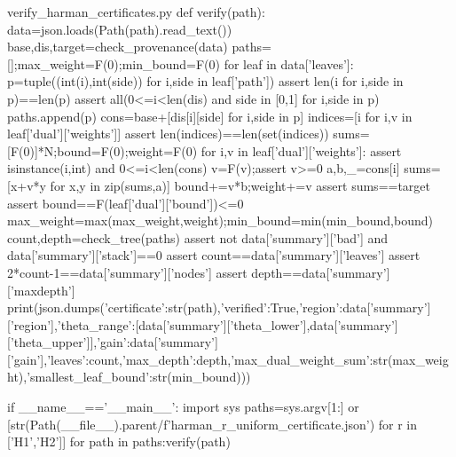 \begin{filecontents*}[overwrite]{verify_harman_certificates.py}
def verify(path):
    data=json.loads(Path(path).read_text())
    base,dis,target=check_provenance(data)
    paths=[];max_weight=F(0);min_bound=F(0)
    for leaf in data['leaves']:
        p=tuple((int(i),int(side)) for i,side in leaf['path'])
        assert len({i for i,side in p})==len(p)
        assert all(0<=i<len(dis) and side in [0,1] for i,side in p)
        paths.append(p)
        cons=base+[dis[i][side] for i,side in p]
        indices=[i for i,v in leaf['dual']['weights']]
        assert len(indices)==len(set(indices))
        sums=[F(0)]*N;bound=F(0);weight=F(0)
        for i,v in leaf['dual']['weights']:
            assert isinstance(i,int) and 0<=i<len(cons)
            v=F(v);assert v>=0
            a,b,_=cons[i]
            sums=[x+v*y for x,y in zip(sums,a)]
            bound+=v*b;weight+=v
        assert sums==target
        assert bound==F(leaf['dual']['bound'])<=0
        max_weight=max(max_weight,weight);min_bound=min(min_bound,bound)
    count,depth=check_tree(paths)
    assert not data['summary']['bad'] and data['summary']['stack']==0
    assert count==data['summary']['leaves']
    assert 2*count-1==data['summary']['nodes']
    assert depth==data['summary']['maxdepth']
    print(json.dumps({'certificate':str(path),'verified':True,'region':data['summary']['region'],'theta_range':[data['summary']['theta_lower'],data['summary']['theta_upper']],'gain':data['summary']['gain'],'leaves':count,'max_depth':depth,'max_dual_weight_sum':str(max_weight),'smallest_leaf_bound':str(min_bound)}))

if __name__=='__main__':
    import sys
    paths=sys.argv[1:] or [str(Path(__file__).parent/f'harman_{r}_uniform_certificate.json') for r in ['H1','H2']]
    for path in paths:verify(path)
\end{filecontents*}
